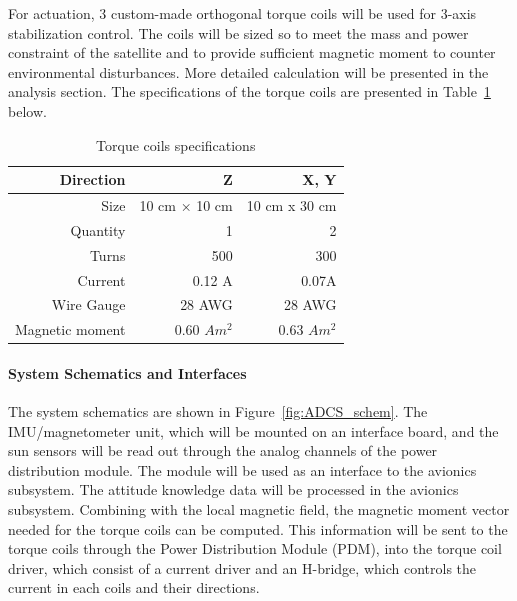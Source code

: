 \documentclass[12pt]{article}
\begin{document}
For actuation, 3 custom-made orthogonal torque coils will be used for 3-axis stabilization control. The coils will be sized so to meet the mass and power constraint of the satellite and to provide sufficient magnetic moment to counter environmental disturbances. More detailed calculation will be presented in the analysis section. The specifications of the torque coils are presented in Table~\ref{tab:ADCS_torquecoils} below.
\begin{table}[htbp]
  \centering
  \caption{Torque coils specifications}
    \begin{tabular}{|r|r|r|}
    \hline
    Direction & Z     & X, Y \bigstrut\\
    \hline
    Size  & 10 cm × 10 cm  & 10 cm x 30 cm \bigstrut\\
    \hline
    Quantity & 1     & 2 \bigstrut\\
    \hline
    Turns & 500   & 300 \bigstrut\\
    \hline
    Current & 0.12 A & 0.07A \bigstrut\\
    \hline
    Wire Gauge & 28 AWG & 28 AWG \bigstrut\\
    \hline
    Magnetic moment & 0.60 $Am^2$ & 0.63 $Am^2$ \bigstrut\\
    \hline
    \end{tabular}%
  \label{tab:ADCS_torquecoils}%
\end{table}%
				\paragraph{System Schematics and Interfaces}
				The system schematics are shown in Figure~\ref{fig:ADCS_schem}. The IMU/magnetometer unit, which will be mounted on an interface board, and the sun sensors will be read out through the analog channels of the power distribution module. The module will be used as an interface to the avionics subsystem. The attitude knowledge data will be processed in the avionics subsystem. Combining with the local magnetic field, the magnetic moment vector needed for the torque coils can be computed. This information will be sent to the torque coils through the Power Distribution Module (PDM), into the torque coil driver, which consist of a current driver and an H-bridge, which controls the current in each coils and their directions. 
			
\end{document}
